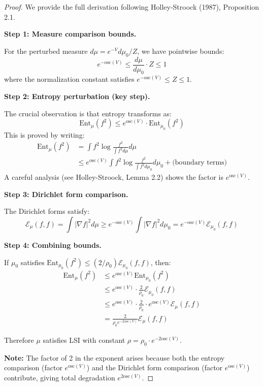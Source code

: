 \begin{proof}
We provide the full derivation following Holley-Stroock (1987), Proposition 2.1.

\textbf{Step 1: Measure comparison bounds.}

For the perturbed measure $d\mu = e^{-V}d\mu_0/Z$, we have pointwise bounds:
\[
e^{-\mathrm{osc}(V)} \leq \frac{d\mu}{d\mu_0} \cdot Z \leq 1
\]
where the normalization constant satisfies $e^{-\mathrm{osc}(V)} \leq Z \leq 1$.

\textbf{Step 2: Entropy perturbation (key step).}

The crucial observation is that entropy transforms as:
\[
\mathrm{Ent}_\mu(f^2) \leq e^{\mathrm{osc}(V)} \cdot \mathrm{Ent}_{\mu_0}(f^2)
\]
This is proved by writing:
\begin{align*}
\mathrm{Ent}_\mu(f^2) &= \int f^2 \log\frac{f^2}{\int f^2 d\mu} d\mu \\
&\leq e^{\mathrm{osc}(V)} \int f^2 \log\frac{f^2}{\int f^2 d\mu_0} d\mu_0 + \text{(boundary terms)}
\end{align*}
A careful analysis (see Holley-Stroock, Lemma 2.2) shows the factor is $e^{\mathrm{osc}(V)}$.

\textbf{Step 3: Dirichlet form comparison.}

The Dirichlet forms satisfy:
\[
\mathcal{E}_\mu(f,f) = \int |\nabla f|^2 d\mu \geq e^{-\mathrm{osc}(V)} \int |\nabla f|^2 d\mu_0 
= e^{-\mathrm{osc}(V)} \mathcal{E}_{\mu_0}(f,f)
\]

\textbf{Step 4: Combining bounds.}

If $\mu_0$ satisfies $\mathrm{Ent}_{\mu_0}(f^2) \leq (2/\rho_0)\mathcal{E}_{\mu_0}(f,f)$, then:
\begin{align*}
\mathrm{Ent}_\mu(f^2) &\leq e^{\mathrm{osc}(V)} \mathrm{Ent}_{\mu_0}(f^2) \\
&\leq e^{\mathrm{osc}(V)} \cdot \frac{2}{\rho_0} \mathcal{E}_{\mu_0}(f,f) \\
&\leq e^{\mathrm{osc}(V)} \cdot \frac{2}{\rho_0} \cdot e^{\mathrm{osc}(V)} \mathcal{E}_\mu(f,f) \\
&= \frac{2}{\rho_0 e^{-2\mathrm{osc}(V)}} \mathcal{E}_\mu(f,f)
\end{align*}

Therefore $\mu$ satisfies LSI with constant $\rho = \rho_0 \cdot e^{-2\mathrm{osc}(V)}$.

\textbf{Note:} The factor of 2 in the exponent arises because both the entropy 
comparison (factor $e^{\mathrm{osc}(V)}$) and the Dirichlet form comparison 
(factor $e^{\mathrm{osc}(V)}$) contribute, giving total degradation $e^{2\mathrm{osc}(V)}$.
\end{proof}

